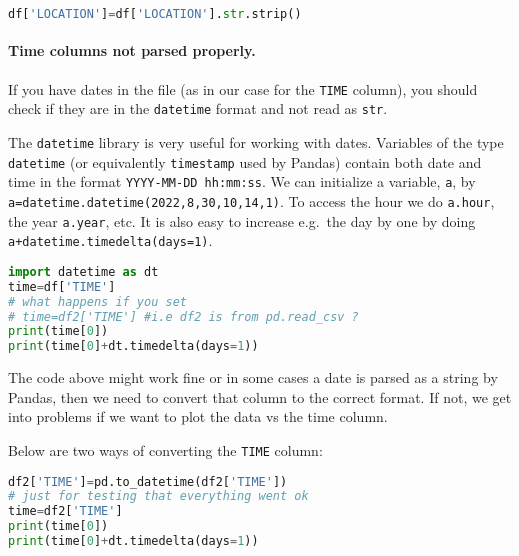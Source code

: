\documentclass[graybox,sectrefs,envcountresetchap,open=right,final]{svmonodo}
\newenvironment{graybox2admon}[1][]{
\begin{graybox2mdframed}[frametitle=#1]
}
{
\end{graybox2mdframed}
}
\begin{document}
\begin{lstlisting}[language=python,style=blue1bar]
df['LOCATION']=df['LOCATION'].str.strip()

\end{lstlisting}


\paragraph{Time columns not parsed properly.}
If you have dates in the file (as in our case for the \texttt{TIME} column), you should check if they are in the \texttt{datetime} format and not read as \texttt{str}.



\begin{graybox2admon}[\texttt{datetime}]
The \texttt{datetime} library is very useful for working with dates. Variables of the type \texttt{datetime} (or equivalently \texttt{timestamp} used by Pandas) contain both date and time in the format \texttt{YYYY-MM-DD hh:mm:ss}. We can initialize a variable, \texttt{a}, by \texttt{a=datetime.datetime(2022,8,30,10,14,1)}. To access the hour we do \texttt{a.hour}, the year \texttt{a.year}, etc. It is also easy to increase e.g.~the day by one by doing \texttt{a+datetime.timedelta(days=1)}.
\end{graybox2admon}











\begin{lstlisting}[language=python,style=blue1bar]
import datetime as dt
time=df['TIME']
# what happens if you set
# time=df2['TIME'] #i.e df2 is from pd.read_csv ?
print(time[0])
print(time[0]+dt.timedelta(days=1))

\end{lstlisting}


The code above might work fine or in some cases a date is parsed as a string by Pandas, then we need to convert that column to the correct format. If not, we get into problems if we want to plot the data vs the time column.

Below are two ways of converting the \texttt{TIME} column:






\begin{lstlisting}[language=python,style=blue1bar]
df2['TIME']=pd.to_datetime(df2['TIME'])
# just for testing that everything went ok
time=df2['TIME']
print(time[0])
print(time[0]+dt.timedelta(days=1))

\end{lstlisting}
\end{document}
